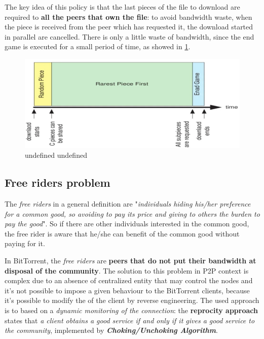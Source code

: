 \documentclass[10pt,a4paper]{report}
\begin{document}
The key idea of this policy is that the last pieces of the file to download are required to \textbf{all the peers that own the file}: to avoid bandwidth waste, when the piece is received from the peer which has requested it, the download started in parallel are cancelled.
There is only a little waste of bandwidth, since the end game is executed for a small period of time, as showed in \ref{timeline}.

\begin{figure}[b]
	\centering
	\includegraphics[scale=0.50]{images/Pasted image 20230311102701.png}
	\caption{undefined undefined}
	\label{timeline}
\end{figure}


\subsection{Free riders problem}\label{sec:free-riders-problem}
The \textit{free riders} in a general definition are "\textit{individuals hiding his/her preference for a common good, so avoiding to pay its price and giving to others the burden to pay the good}". So if there are other individuals interested in the common good, the free rider is aware that he/she can benefit of the common good without paying for it.

In BitTorrent, the \textit{free riders} are \textbf{peers that do not put their bandwidth at disposal of the community}. The solution to this problem in P2P context is complex due to an absence of centralized entity that may control the nodes and it's not possible to impose a given behaviour to the BitTorrent clients, because it's possible to modify the of the client by reverse engineering.
The used approach is to based on a \textit{dynamic monitoring of the connection}: the \textbf{reprocity approach} states that \textit{a client obtains a good service if and only if it gives a good service to the community}, implemented by \textit{\textbf{Choking/Unchoking Algorithm}}.
\end{document}
